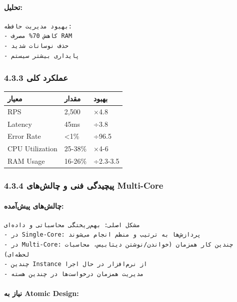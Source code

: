 \documentclass[
]{article}
\newcounter{none} %
\begin{document}
\paragraph{تحلیل:}\label{ux62aux62dux644ux6ccux644-3}

\begin{verbatim}
بهبود مدیریت حافظه:
- کاهش 70% مصرف RAM
- حذف نوسانات شدید
- پایداری بیشتر سیستم
\end{verbatim}

\subsubsection{4.3.3 عملکرد
کلی}\label{ux639ux645ux644ux6a9ux631ux62f-ux6a9ux644ux6cc-1}

{\def\LTcaptype{none} %
\begin{longtable}[]{@{}lll@{}}
\toprule\noalign{}
معیار & مقدار & بهبود \\
\midrule\noalign{}
\endhead
\bottomrule\noalign{}
\endlastfoot
RPS & 2,500 & ×4.8 \\
Latency & 45ms & ÷3.8 \\
Error Rate & \textless1\% & ÷96.5 \\
CPU Utilization & 25-38\% & ×4-6 \\
RAM Usage & 16-26\% & ÷2.3-3.5 \\
\end{longtable}
}

\subsubsection{4.3.4 پیچیدگی فنی و چالش‌های
Multi-Core}\label{ux67eux6ccux686ux6ccux62fux6afux6cc-ux641ux646ux6cc-ux648-ux686ux627ux644ux634ux647ux627ux6cc-multi-core}

\paragraph{چالش‌های
پیش‌آمده:}\label{ux686ux627ux644ux634ux647ux627ux6cc-ux67eux6ccux634ux622ux645ux62fux647}

\begin{verbatim}
مشکل اصلی: بهم‌ریختگی محاسباتی و داده‌ای
- در Single-Core: پردازش‌ها به ترتیب و منظم انجام می‌شوند
- در Multi-Core: چندین کار همزمان (خواندن/نوشتن دیتابیس، محاسبات لحظه‌ای)
- چندین Instance از نرم‌افزار در حال اجرا
- مدیریت همزمان درخواست‌ها در چندین هسته
\end{verbatim}

\paragraph{نیاز به Atomic
Design:}\label{ux646ux6ccux627ux632-ux628ux647-atomic-design}
\end{document}
